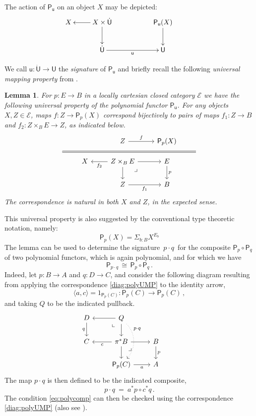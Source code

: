 \documentclass[12pt,reqno]{amsart}
\newcommand{\EE}{\ensuremath{\mathcal{E}}}
\newcommand{\alg}[1]{\ensuremath{\mathsf{#1}}}
\renewcommand{\to}{\ensuremath{\rightarrow}}
\renewcommand{\t}{\ensuremath{\mathsf{u}}}
\newcommand{\T}{\ensuremath{\mathsf{U}}}
\newcommand{\TT}{\ensuremath{\dot{\mathsf{U}}}}
\newcommand{\tT}{\ensuremath{{\t}:\TT\to\T}}
\newcommand{\pbcorner}{\arrow[dr,phantom,"\lrcorner" very near start, shift right=.5ex]} %
\newcommand{\pbcornerright}{\arrow[dl,phantom,"\llcorner" very near start, shift left=.5ex]} %
\newtheorem{lemma}[theorem]{Lemma}
\theoremstyle{remark}
\theoremstyle{definition}
\begin{document}
The action of $\alg{P}_\t$ on an object $X$ may be depicted:
\begin{equation*}
\xymatrix{
 X & \ar[l] X\times \TT \ar[d] && \alg{P}_\t(X) \ar[d] \\
	& \TT \ar[rr]_{\t} && \T 
 }\qquad\quad
 \end{equation*}

We call $\tT$ the \emph{signature} of $\alg{P}_\t$ and briefly recall the following \emph{universal mapping property} from \cite{awodey:NM}.

\begin{lemma}
 For $p: E \to B$ in a locally cartesian closed category $\EE$ we have the following universal property of the polynomial functor $\alg{P}_\t$. For any objects $X, Z \in \EE$, maps $f : Z \to \alg{P}_p (X)$ correspond bijectively to pairs of maps $f_1 : Z \to B$ and $f_2 : Z\times_B E \to Z$, as indicated below.
\begin{equation}\label{diag:polyUMP}
\begin{tikzcd}
&& Z \ar[r,"f"] & \alg{P}_p (X) & \\[-5ex]
\strut \ar[rrrr, equal] &&&& \strut\\[-5ex]
&X & \ar[l,"f_2"] Z\times_B E \ar[d] \ar[r] \pbcorner & E \ar[d, "p"] &\\
&& Z \ar[r,swap,"f_1"] & B &
\end{tikzcd}
\end{equation}
The correspondence is natural in both $X$ and $Z$, in the expected sense.
\end{lemma}

This universal property is also suggested by the conventional type theoretic notation, namely: $$\alg{P}_p (X) = \Sigma_{b:B} X^{E_b}$$
The lemma can be used to determine the signature $\, p\cdot q\, $ for the composite $\alg{P}_p \circ \alg{P}_q$ of two polynomial functors, which is again polynomial, and for which we have
\begin{equation}\label{eq:polycomp}
\alg{P}_{p\cdot q}\, \cong\, \alg{P}_p \circ \alg{P}_q\,.
\end{equation}
Indeed, let $p : B \to A$ and $q : D \to C$, and consider the following diagram resulting from applying the correspondence \eqref{diag:polyUMP} to the identity arrow,
\[
\langle a, c\rangle = 1_{\alg{P}_p(C)} : \alg{P}_p(C) \to \alg{P}_p(C)\,,
\]
and taking $Q$ to be the indicated pullback.
%
\begin{equation}\label{diag:polyUMP2}
\begin{tikzcd}
D \ar[d,swap,"q"] & \ar[l] Q \ar[d] \pbcornerright  \ar[dd, dotted, bend left = 10ex ,near start, "{p\cdot q}"]& & \\
 C  & \ar[l,"c"] \pi^*B \ar[d] \ar[r] \pbcorner & B \ar[d,"p"] \\
&  \alg{P}_p(C) \ar[r,swap,"a"] & A
\end{tikzcd}
\end{equation}
The map $p\cdot q$ is then defined to be the indicated composite,
\[
p\cdot q\ =\ a^*p \circ c^*q\,.
\]
The condition \eqref{eq:polycomp} can then be checked using the correspondence \eqref{diag:polyUMP} (also see \cite{GambinoKoch:2013}).
\end{document}
